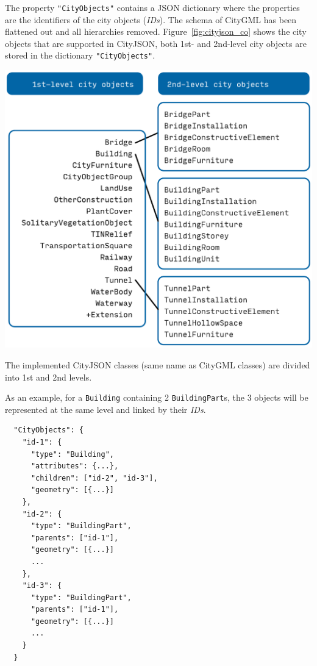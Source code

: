 The property \texttt{"CityObjects"} contains a JSON dictionary where the properties are the identifiers of the city objects (\emph{IDs}).
The schema of CityGML has been flattened out and all hierarchies removed.
Figure~\ref{fig:cityjson_co} shows the city objects that are supported in CityJSON, both 1st- and 2nd-level city objects are stored in the dictionary \texttt{"CityObjects"}.
\begin{marginfigure}
  \centering
  \includegraphics[width=\linewidth]{figs/cityjson_co}
  \caption{The implemented CityJSON classes (same name as CityGML classes) are divided into 1st and 2nd levels.}%
\label{fig:cityjson_co}
\end{marginfigure}

%

As an example, for a \texttt{Building} containing 2 \texttt{BuildingPart}s, the 3 objects will be represented at the same level and linked by their \emph{IDs}.
\begin{lstlisting}
  "CityObjects": {
    "id-1": {
      "type": "Building",
      "attributes": {...},
      "children": ["id-2", "id-3"],
      "geometry": [{...}]
    },
    "id-2": {
      "type": "BuildingPart",
      "parents": ["id-1"],
      "geometry": [{...}]
      ...
    },
    "id-3": {
      "type": "BuildingPart",
      "parents": ["id-1"],
      "geometry": [{...}]
      ...
    }
  }
\end{lstlisting}

